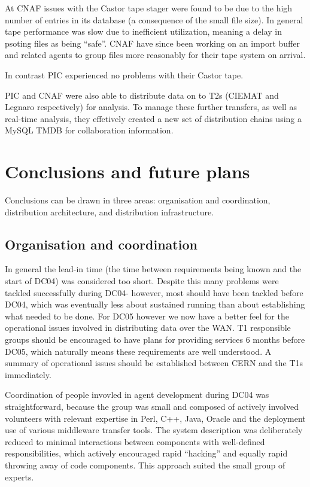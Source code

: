 \documentclass{cmspaper}
\begin{document}
At CNAF issues with the Castor tape stager were found to be due to the
high number of entries in its database (a consequence of the small
file size). In general tape performance was slow due to inefficient
utilization, meaning a delay in psoting files as being ``safe''. CNAF
have since been working on an import buffer and related agents to
group files more reasonably for their tape system on arrival.

In contrast PIC experienced no problems with their Castor tape.

PIC and CNAF were also able to distribute data on to T2s (CIEMAT and
Legnaro respectively) for analysis. To manage these further transfers,
as well as real-time analysis, they effetively created a new set of
distribution chains using a MySQL TMDB for collaboration information.

\section{Conclusions and future plans}
Conclusions can be drawn in three areas: organisation and coordination, distribution 
architecture, and distribution infrastructure.

\subsection{Organisation and coordination}
In general the lead-in time (the time between requirements being known
and the start of DC04) was considered too short. Despite this many
problems were tackled successfully during DC04- however, most should
have been tackled before DC04, which was eventually less about
sustained running than about establishing what needed to be done. For
DC05 however we now have a better feel for the operational issues
involved in distributing data over the WAN. T1 responsible groups
should be encouraged to have plans for providing services 6 months
before DC05, which naturally means these requirements are well
understood. A summary of operational issues should be established
between CERN and the T1s immediately.

Coordination of people invovled in agent development during DC04 was
straightforward, because the group was small and composed of actively
involved volunteers with relevant expertise in Perl, C++, Java, Oracle
and the deployment use of various middleware transfer tools. The
system description was deliberately reduced to minimal interactions
between components with well-defined responsibilities, which actively
encouraged rapid ``hacking'' and equally rapid throwing away of code
components. This approach suited the small group of experts.
\end{document}
